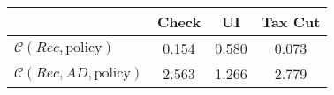 \begin{tabular}{@{}lccc@{}} 
\toprule 
                          & Check      & UI    & Tax Cut    \\  \midrule 
$\mathcal{C}(Rec,\text{policy})$ & 0.154  & 0.580  & 0.073     \\ 
$\mathcal{C}(Rec, AD,\text{policy})$ & 2.563  & 1.266  & 2.779     \\ 
\end{tabular}  
